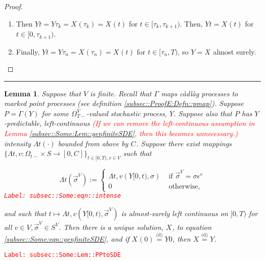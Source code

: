 \documentclass[12pt]{article}
\newcommand{\ra}{\rightarrow}
\newcommand{\te}{\text}
\newcommand{\ep}{\epsilon}
\newcommand{\tr}{\textcolor{red}}
\newcommand{\labe}[1]{\tr{\texttt{Label: #1}}}
\newcommand{\lin}{\rule{\linewidth}{0.4 pt}}
\newcommand{\deq}{\overset{\text{(d)}}{=}}			%
\renewcommand{\v}{v}							%
\renewcommand{\S}{S}							%
\newcommand{\s}{\sigma}							%
\newcommand{\sv}{\vec{\s}}						%
\newcommand{\ev}{\ep}							%
\newcommand{\T}{T}								%
\renewcommand{\t}{t}							%
\newcommand{\sset}{\Omega}						%
\newcommand{\X}{X}								%
\newcommand{\vind}[1]{^{#1}}					%
\newcommand{\carp}[1]{^{#1}}					%
\newcommand{\vsi}[1]{^{#1}}						%
\newcommand{\cind}[1]{_{#1}}					%
\newcommand{\tp}[1]{(#1)}						%
\newcommand{\tip}[1]{#1}						%
\newcommand{\ts}[1]{_{#1}}						%
\newcommand{\const}{C}							%
\newcommand{\indx}[1]{_{#1}}					%
\newcommand{\XX}{Y}								%
\newcommand{\rt}{\tau}							%
\renewcommand{\it}{k}							%
\newcommand{\pmap}{\Gamma}						%
\newcommand{\rp}{P}								%
\newcommand{\ratee}{\Lambda}					%
\newtheorem{lem}[thms]{Lemma}
\begin{document}
\begin{proof}
\begin{enumerate}
\item Then \(\XX{}{\t} = \XX{}{\rt\indx{\it}} = \X\cind{}\tp{\rt\indx{\it}} = \X\cind{}\tp{\t}\) for \(\t \in [\rt\indx{\it},\rt\indx{\it+1})\). Then, \(\XX{}{\t} = \X\cind{}\tp{\t}\) for \(\t\in [0,\rt\indx{\it+1})\).

\item Finally, \(\XX{}{\t} = \XX{}{\rt\indx{n}} = \X\cind{}\tp{\rt\indx{n}} = \X\cind{}\tp{\t}\) for \(\t\in [\rt\indx{n},\T)\), so \(\XX{}{} = \X\cind{}\tip{}\) almost surely.
\end{enumerate}
\end{proof}

\lin

\begin{lem}
Suppose that \(V\) is finite. Recall that \(\pmap{}\) maps c\`adl\`ag processes to marked point processes (see definition \ref{subsec::ProofE:Defn::pmap}). Suppose \(\rp{} = \pmap{}(\XX{}{})\) for some \(\sset\vsi{V}\ts{\T-}\)-valued stochastic process, \(\XX{}{}\). Suppose also that \(\rp{}\) has \(\XX{}{}\)-predictable, left-continuous \tr{(If we can remove the left-continuous assumption in Lemma \ref{subsec::Some:Lem::genfiniteSDE}, then this becomes unnecessary.)} intensity \(\ratee{\t}(\cdot)\) bounded from above by \(\const\indx{}\). Suppose there exist mappings \(\{\ratee{\t,\v}:\sset\vsi{}\ts{\t-}\times \S \ra [0,\const\indx{}]\}_{\t\in[0,\T),\v\in V}\) such that 

\begin{equation}
\ratee{\t}(\sv\cind{}\vsi{V}) := \begin{cases}
\ratee{\t,\v}(\XX{}{[0,\t)},\s) &\te{ if } \sv\cind{}\vsi{V} = \s\ev\vind{\v}\\
0 &\te{ otherwise,}
\end{cases}
\label{subsec::Some:eqn::intense}
\end{equation}
\labe{subsec::Some:eqn::intense}

and such that \(\t\mapsto \ratee{\t,\v}(\XX{}{[0,\t)},\sv\cind{}\vsi{V})\) is almost-surely left continuous on \([0,\T)\) for all \(\v\in V,\sv\cind{}\vsi{V}\in \S\carp{V}\). Then there is a unique solution, \(\X\cind{}\tip{}\), to equation \eqref{subsec::Some:eqn::genfiniteSDE}, and if \(\X\cind{}\tp{0} \deq \XX{}{0}\), then \(\X\cind{}\tip{} \deq \XX{}{}\).

\label{subsec::Some:Lem::PPtoSDE}
\end{lem}
\labe{subsec::Some:Lem::PPtoSDE}
\end{document}
